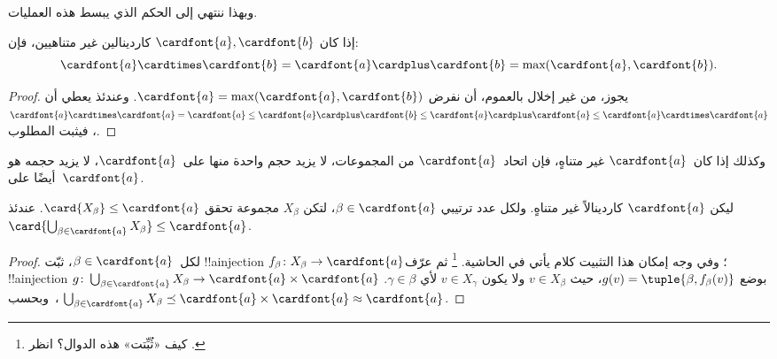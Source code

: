 \documentclass[../../../include/open-logic-section]{subfiles}
\begin{document}
وبهذا ننتهي إلى الحكم الذي يبسط هذه العمليات.

\begin{thm}
إذا كان $\cardfont{a}, \cardfont{b}$ كاردينالين غير متناهيين، فإن:
\[
	\cardfont{a}
\cardtimes \cardfont{b} = \cardfont{a} \cardplus \cardfont{b} =
\text{max}(\cardfont{a}, \cardfont{b}).
\]
\end{thm}

\begin{proof}
يجوز، من غير إخلال بالعموم، أن نفرض
$\cardfont{a} = \max(\cardfont{a}, \cardfont{b})$. وعندئذ يعطي
 أن
$\cardfont{a}\cardtimes\cardfont{a} = \cardfont{a} \leq \cardfont{a}
\cardplus \cardfont{b} \leq \cardfont{a} \cardplus \cardfont{a} \leq
\cardfont{a} \cardtimes \cardfont{a}$، فيثبت المطلوب.
\end{proof}\noindent
وكذلك إذا كان~$\cardfont{a}$ غير متناهٍ، فإن اتحاد~$\cardfont{a}$
من المجموعات، لا يزيد حجم واحدة منها على~$\cardfont{a}$، لا يزيد حجمه
هو أيضًا على~$\cardfont{a}$.

\begin{prop}
ليكن $\cardfont{a}$ كاردينالاً غير متناهٍ. ولكل عدد ترتيبي
$\beta \in \cardfont{a}$، لتكن $X_\beta$ مجموعة تحقق
$\card{X_\beta} \leq \cardfont{a}$. عندئذ
$\card{\bigcup_{\beta \in \cardfont{a}} X_\beta} \leq \cardfont{a}$.
\end{prop}

\begin{proof}
لكل~$\beta \in \cardfont{a}$، ثبّت !!a{injection}
$f_\beta \colon X_\beta \to \cardfont{a}$؛ وفي وجه إمكان هذا
التثبيت كلام يأتي في الحاشية.
\footnote{كيف «ثُبِّتت» هذه
الدوال؟ انظر .}
ثم عرّف !!a{injection} $g \colon
\bigcup_{\beta \in \cardfont{a}} X_\beta \to \cardfont{a} \times
\cardfont{a}$ بوضع $g(v) = \tuple{\beta, f_\beta(v)}$، حيث
$v \in X_\beta$ ولا يكون $v \in X_\gamma$ لأي $\gamma \in \beta$.
وبحسب~،
$\bigcup_{\beta \in \cardfont{a}} X_\beta \preceq
\cardfont{a} \times \cardfont{a} \approx \cardfont{a}$.
\end{proof}
\end{document}
